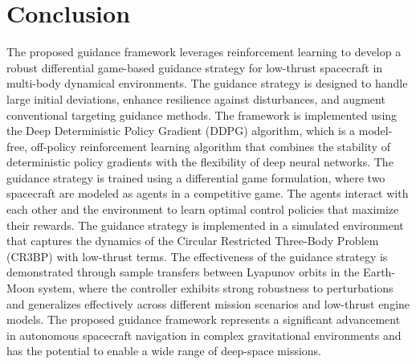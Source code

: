 \documentclass[conference]{IEEEtran}
\begin{document}
\section{Conclusion}
The proposed guidance framework leverages reinforcement learning to develop a robust differential game-based guidance strategy for low-thrust spacecraft in multi-body dynamical environments. The guidance strategy is designed to handle large initial deviations, enhance resilience against disturbances, and augment conventional targeting guidance methods. The framework is implemented using the Deep Deterministic Policy Gradient (DDPG) algorithm, which is a model-free, off-policy reinforcement learning algorithm that combines the stability of deterministic policy gradients with the flexibility of deep neural networks. The guidance strategy is trained using a differential game formulation, where two spacecraft are modeled as agents in a competitive game. The agents interact with each other and the environment to learn optimal control policies that maximize their rewards. The guidance strategy is implemented in a simulated environment that captures the dynamics of the Circular Restricted Three-Body Problem (CR3BP) with low-thrust terms. The effectiveness of the guidance strategy is demonstrated through sample transfers between Lyapunov orbits in the Earth-Moon system, where the controller exhibits strong robustness to perturbations and generalizes effectively across different mission scenarios and low-thrust engine models. The proposed guidance framework represents a significant advancement in autonomous spacecraft navigation in complex gravitational environments and has the potential to enable a wide range of deep-space missions.








\end{document}
